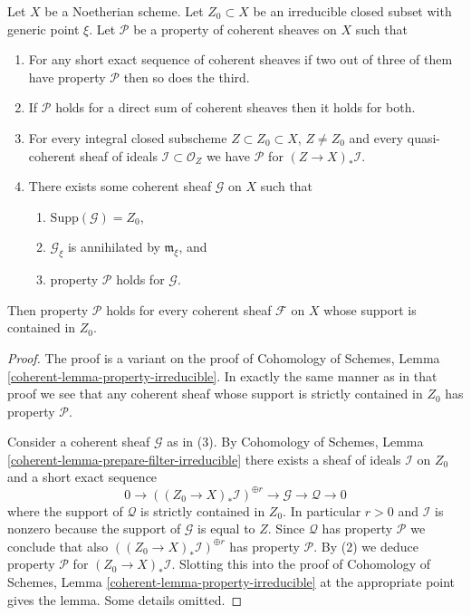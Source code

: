 \begin{lemma}
\label{lemma-property-irreducible-higher-rank}
Let $X$ be a Noetherian scheme.
Let $Z_0 \subset X$ be an irreducible closed subset with generic point $\xi$.
Let $\mathcal{P}$ be a property of coherent sheaves on $X$ such that
\begin{enumerate}
\item For any short exact sequence of coherent sheaves if two
out of three of them have property $\mathcal{P}$ then so does the
third.
\item If $\mathcal{P}$ holds for a direct sum of coherent sheaves
then it holds for both.
\item For every integral closed subscheme $Z \subset Z_0 \subset X$,
$Z \not = Z_0$ and every quasi-coherent sheaf of ideals
$\mathcal{I} \subset \mathcal{O}_Z$ we have
$\mathcal{P}$ for $(Z \to X)_*\mathcal{I}$.
\item There exists some coherent sheaf $\mathcal{G}$ on $X$ such that
\begin{enumerate}
\item $\text{Supp}(\mathcal{G}) = Z_0$,
\item $\mathcal{G}_\xi$ is annihilated by $\mathfrak m_\xi$, and
\item property $\mathcal{P}$ holds for $\mathcal{G}$.
\end{enumerate}
\end{enumerate}
Then property $\mathcal{P}$ holds for every coherent sheaf
$\mathcal{F}$ on $X$ whose support is contained in $Z_0$.
\end{lemma}

\begin{proof}
The proof is a variant on the proof of
Cohomology of Schemes, Lemma \ref{coherent-lemma-property-irreducible}.
In exactly the same manner as in that proof we see that
any coherent sheaf whose support is strictly contained in $Z_0$
has property $\mathcal{P}$.

\medskip\noindent
Consider a coherent sheaf $\mathcal{G}$ as in (3).
By Cohomology of Schemes, Lemma \ref{coherent-lemma-prepare-filter-irreducible}
there exists a sheaf of ideals $\mathcal{I}$ on $Z_0$ and
a short exact sequence
$$
0 \to
\left((Z_0 \to X)_*\mathcal{I}\right)^{\oplus r} \to
\mathcal{G} \to
\mathcal{Q} \to 0
$$
where the support of $\mathcal{Q}$ is strictly contained in $Z_0$.
In particular $r > 0$ and $\mathcal{I}$ is nonzero
because the support of $\mathcal{G}$ is equal to $Z$.
Since $\mathcal{Q}$ has property $\mathcal{P}$ we conclude that
also $\left((Z_0 \to X)_*\mathcal{I}\right)^{\oplus r}$
has property $\mathcal{P}$.
By (2) we deduce property $\mathcal{P}$ for
$(Z_0 \to X)_*\mathcal{I}$. Slotting this into the proof of
Cohomology of Schemes, Lemma \ref{coherent-lemma-property-irreducible}
at the appropriate point gives the lemma.
Some details omitted.
\end{proof}

